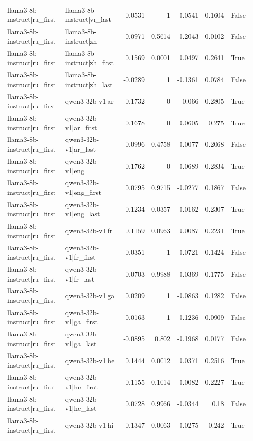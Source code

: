 \begin{table}
\begin{tabular}{l l r r r r l}
llama3-8b-instruct|ru_first & llama3-8b-instruct|vi_last & 0.0531 & 1 & -0.0541 & 0.1604 & False \\
llama3-8b-instruct|ru_first & llama3-8b-instruct|zh & -0.0971 & 0.5614 & -0.2043 & 0.0102 & False \\
llama3-8b-instruct|ru_first & llama3-8b-instruct|zh_first & 0.1569 & 0.0001 & 0.0497 & 0.2641 & True \\
llama3-8b-instruct|ru_first & llama3-8b-instruct|zh_last & -0.0289 & 1 & -0.1361 & 0.0784 & False \\
llama3-8b-instruct|ru_first & qwen3-32b-v1|ar & 0.1732 & 0 & 0.066 & 0.2805 & True \\
llama3-8b-instruct|ru_first & qwen3-32b-v1|ar_first & 0.1678 & 0 & 0.0605 & 0.275 & True \\
llama3-8b-instruct|ru_first & qwen3-32b-v1|ar_last & 0.0996 & 0.4758 & -0.0077 & 0.2068 & False \\
llama3-8b-instruct|ru_first & qwen3-32b-v1|eng & 0.1762 & 0 & 0.0689 & 0.2834 & True \\
llama3-8b-instruct|ru_first & qwen3-32b-v1|eng_first & 0.0795 & 0.9715 & -0.0277 & 0.1867 & False \\
llama3-8b-instruct|ru_first & qwen3-32b-v1|eng_last & 0.1234 & 0.0357 & 0.0162 & 0.2307 & True \\
llama3-8b-instruct|ru_first & qwen3-32b-v1|fr & 0.1159 & 0.0963 & 0.0087 & 0.2231 & True \\
llama3-8b-instruct|ru_first & qwen3-32b-v1|fr_first & 0.0351 & 1 & -0.0721 & 0.1424 & False \\
llama3-8b-instruct|ru_first & qwen3-32b-v1|fr_last & 0.0703 & 0.9988 & -0.0369 & 0.1775 & False \\
llama3-8b-instruct|ru_first & qwen3-32b-v1|ga & 0.0209 & 1 & -0.0863 & 0.1282 & False \\
llama3-8b-instruct|ru_first & qwen3-32b-v1|ga_first & -0.0163 & 1 & -0.1236 & 0.0909 & False \\
llama3-8b-instruct|ru_first & qwen3-32b-v1|ga_last & -0.0895 & 0.802 & -0.1968 & 0.0177 & False \\
llama3-8b-instruct|ru_first & qwen3-32b-v1|he & 0.1444 & 0.0012 & 0.0371 & 0.2516 & True \\
llama3-8b-instruct|ru_first & qwen3-32b-v1|he_first & 0.1155 & 0.1014 & 0.0082 & 0.2227 & True \\
llama3-8b-instruct|ru_first & qwen3-32b-v1|he_last & 0.0728 & 0.9966 & -0.0344 & 0.18 & False \\
llama3-8b-instruct|ru_first & qwen3-32b-v1|hi & 0.1347 & 0.0063 & 0.0275 & 0.242 & True \\

\end{tabular}
\end{table}
